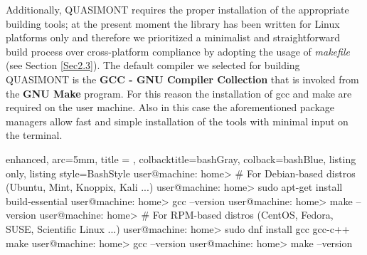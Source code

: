 \documentclass[a4paper, twosided]{book}
\begin{document}
\noindent
Additionally, QUASIMONT requires the proper installation of the appropriate building tools; at the present moment the library has been written for Linux platforms only and therefore we prioritized a minimalist and straightforward build process over cross-platform compliance by adopting the usage of {\itshape makefile} (see Section \ref{Sec2.3}). The default compiler we selected for building QUASIMONT is the \color{poliDarkBlue} \textbf{GCC - GNU Compiler Collection} \color{black} \cite{gcc} that is invoked from the \color{poliDarkBlue} \textbf{GNU Make} \color{black} \cite{make} program. For this reason the installation of \colorbox{poliGrayBlue}{gcc} and \colorbox{poliGrayBlue}{make} are required on the user machine. Also in this case the aforementioned package managers allow fast and simple installation of the tools with minimal input on the terminal.

\vspace{0.5cm}
\begin{tcblisting}{enhanced,
                   arc=5mm,
                   title = \color{black}{\large \ttfamily Installation of building tools},
                   colbacktitle=bashGray,
                   colback=bashBlue,
                   listing only,
                   listing style=BashStyle}
user@machine: home> # For Debian-based distros (Ubuntu, Mint, Knoppix, Kali ...)
user@machine: home> sudo apt-get install build-essential
user@machine: home> gcc --version
user@machine: home> make --version
user@machine: home> # For RPM-based distros (CentOS, Fedora, SUSE, Scientific Linux ...)
user@machine: home> sudo dnf install gcc gcc-c++ make
user@machine: home> gcc --version
user@machine: home> make --version
\end{tcblisting}
\vspace{0.5cm}
\end{document}
